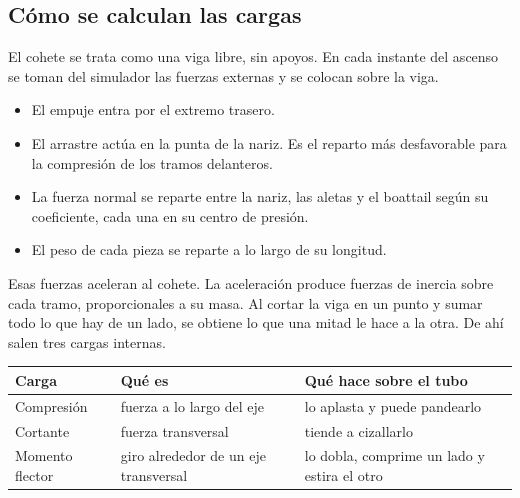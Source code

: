 \subsection{Cómo se calculan las
cargas}\label{cuxf3mo-se-calculan-las-cargas}

El cohete se trata como una viga libre, sin apoyos. En cada
instante del ascenso se toman del simulador las fuerzas
externas y se colocan sobre la viga.

\begin{itemize}
\tightlist
\item
  El empuje entra por el extremo trasero.
\item
  El arrastre actúa en la punta de la nariz. Es el reparto
  más desfavorable para la compresión de los tramos
  delanteros.
\item
  La fuerza normal se reparte entre la nariz, las aletas y
  el boattail según su coeficiente, cada una en su centro de
  presión.
\item
  El peso de cada pieza se reparte a lo largo de su
  longitud.
\end{itemize}

Esas fuerzas aceleran al cohete. La aceleración produce
fuerzas de inercia sobre cada tramo, proporcionales a su
masa. Al cortar la viga en un punto y sumar todo lo que hay
de un lado, se obtiene lo que una mitad le hace a la otra.
De ahí salen tres cargas internas.

{\def\LTcaptype{none} %
\begin{longtable}[]{@{}
  >{\raggedright\arraybackslash}p{}
  >{\raggedright\arraybackslash}p{}
  >{\raggedright\arraybackslash}p{}@{}}
\toprule\noalign{}
\begin{minipage}[b]{\linewidth}\raggedright
Carga
\end{minipage} & \begin{minipage}[b]{\linewidth}\raggedright
Qué es
\end{minipage} & \begin{minipage}[b]{\linewidth}\raggedright
Qué hace sobre el tubo
\end{minipage} \\
\midrule\noalign{}
\endhead
\bottomrule\noalign{}
\endlastfoot
Compresión & fuerza a lo largo del eje & lo aplasta y puede
pandearlo \\
Cortante & fuerza transversal & tiende a cizallarlo \\
Momento flector & giro alrededor de un eje transversal & lo
dobla, comprime un lado y estira el otro \\
\end{longtable}
}

